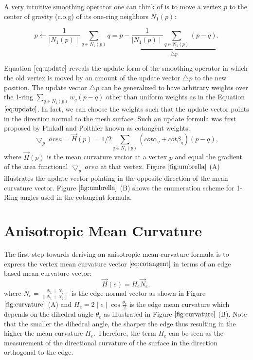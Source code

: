\documentclass[11pt]{article}
\begin{document}
A very intuitive smoothing operator one can think of is to move a vertex $p$ to the center of gravity (c.o.g) of its one-ring neighbors $N_1(p)$:

\begin{equation}
p \leftarrow \frac{1}{\mid N_1(p) \mid}\sum\limits_{q \in N_1(p)}q = p - \underbrace{\frac{1}{\mid N_1(p) \mid}\sum\limits_{q \in N_1(p)}(p - q)}_{\bigtriangleup p}.
\label{eq:update}
\end{equation}

Equation $\ref{eq:update}$ reveals the update form of the smoothing operator in which the old vertex is moved by an amount of the update vector $\bigtriangleup p$ to the new position. The update vector $\bigtriangleup p$ can be generalized to have arbitrary weights over the 1-ring $\sum\limits_{q \in N_1(p)}w_q(p - q)$ other than uniform weights as in the Equation $\ref{eq:update}$. In fact, we can choose the weights such that the update vector points in the direction normal to the mesh surface. Such an update formula was first proposed by Pinkall and Polthier \cite{Pinkall93computingdiscrete} known as cotangent weights:
\begin{equation}
\bigtriangledown_p\ area = \vec{H}(p) = 1/2\sum\limits_{q \in N_1(p)}{(cot\alpha_{q} + cot\beta_{q})(p-q)},
\label{eq:cotangent}
\end{equation}
where $\vec{H}(p)$ is the mean curvature vector at a vertex $p$ and equal the gradient of the area functional $\bigtriangledown_p\ area$ at that vertex. Figure $\ref{fig:umbrella}$ (A) illustrates the update vector pointing in the opposite direction  of the mean curvature vector. Figure $\ref{fig:umbrella}$ (B) shows the enumeration scheme for 1-Ring angles used in the cotangent formula.

\section{Anisotropic Mean Curvature}

The first step towards deriving an anisotropic mean curvature formula is to express the vertex mean curvature vector $\ref{eq:cotangent}$ in terms of an edge based mean curvature vector:
\begin{equation}
  \vec{H}(e) = H_e \vec{N}_e,
  \label{eq:edgeMC}
\end{equation}
where $N_e = \frac{N_1 + N_2}{\parallel N_1 + N_2 \parallel}$ is the edge normal vector as shown in Figure $\ref{fig:curvature}$ (A) and $H_e = 2\mid e \mid \cos \frac{\theta_e}{2}$ is the edge mean curvature which depends on the dihedral angle $\theta_e$ as illustrated in Figure $\ref{fig:curvature}$ (B). Note that the smaller the dihedral angle, the sharper the edge thus resulting in the higher the mean curvature $H_e$. Therefore, the term $H_e$ can be seen as the measurement of the directional curvature of the surface in the direction orthogonal to the edge.
\end{document}
